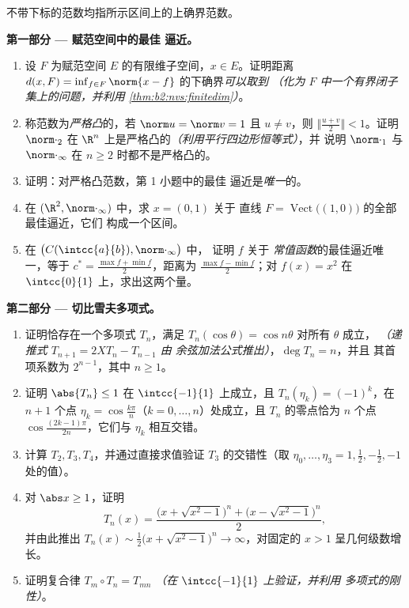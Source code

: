 \begin{problem}
\label{pb:b2:nvs:1}
不带下标的范数均指所示区间上的上确界范数。

\medskip
\noindent\textbf{第一部分 --- 赋范空间中的最佳
逼近。}
\begin{enumerate}
  \item 设 $F$ 为赋范空间
        $E$ 的有限维子空间，$x \in E$。证明距离 $d(x,
        F) = \inf_{f \in F}\norm{x - f}$ 的下确界\emph{可以取到}
        \emph{（化为 $F$ 中一个有界闭子集上的问题，并利用
        \cref{thm:b2:nvs:finitedim}）}。
  \item 称范数为\emph{严格凸}的，若 $\norm u = \norm v
        = 1$ 且 $u \neq v$，则 $\bigl\Vert\frac{u +
        v}2\bigr\Vert < 1$。证明 $\norm\cdot_2$ 在 $\R^n$
        上是严格凸的\emph{（利用平行四边形恒等式）}，并
        说明 $\norm\cdot_1$ 与 $\norm\cdot_\infty$ 在
        $n \geq 2$ 时都不是严格凸的。
  \item 证明：对严格凸范数，第 1 小题中的最佳
        逼近是\emph{唯一}的。
  \item 在 $(\R^2, \norm\cdot_\infty)$ 中，求 $x = (0, 1)$ 关于
        直线 $F =
        \operatorname{Vect}\bigl((1,0)\bigr)$ 的全部最佳逼近，它们
        构成一个区间。
  \item 在 $\bigl(C(\intcc{a}{b}), \norm\cdot_\infty\bigr)$ 中，
        证明 $f$ 关于
        \emph{常值函数}的最佳逼近唯一，等于 $c^* = \frac{\max f
        + \min f}{2}$，距离为 $\frac{\max f - \min
        f}{2}$；对 $f(x) = x^2$ 在
        $\intcc{0}{1}$ 上，求出这两个量。
\end{enumerate}

\medskip
\noindent\textbf{第二部分 --- 切比雪夫多项式。}
\begin{enumerate}[resume]
  \item 证明恰存在一个多项式 $T_n$，满足
        $T_n(\cos\theta) = \cos n\theta$ 对所有 $\theta$ 成立，
        \emph{（递推式 $T_{n+1} = 2XT_n - T_{n-1}$ 由
        余弦加法公式推出）}，$\deg T_n = n$，并且
        其首项系数为 $2^{n-1}$，其中 $n \geq 1$。
  \item 证明 $\abs{T_n} \leq 1$ 在 $\intcc{-1}{1}$ 上成立，且
        $T_n(\eta_k) = (-1)^k$，在 $n + 1$ 个点 $\eta_k =
        \cos\frac{k\pi}{n}$（$k = 0, \dots, n$）处成立，且
        $T_n$ 的零点恰为 $n$ 个点
        $\cos\frac{(2k-1)\pi}{2n}$，它们与 $\eta_k$ 相互交错。
  \item 计算 $T_2, T_3, T_4$，并通过直接求值验证
        $T_3$ 的交错性（取 $\eta_0, \dots, \eta_3 = 1, \frac12, -\frac12,
        -1$ 处的值）。
  \item 对 $\abs x \geq 1$，证明
        \[
        T_n(x) = \frac{\bigl(x + \sqrt{x^2 - 1}\bigr)^n +
        \bigl(x - \sqrt{x^2 - 1}\bigr)^n}{2},
        \]
        并由此推出 $T_n(x) \sim \frac12\bigl(x + \sqrt{x^2 -
        1}\bigr)^n \to \infty$，对固定的 $x > 1$ 呈几何级数增长。
  \item 证明复合律 $T_m \circ T_n = T_{mn}$
        \emph{（在 $\intcc{-1}{1}$ 上验证，并利用
        多项式的刚性）}。
\end{enumerate}


\end{problem}
